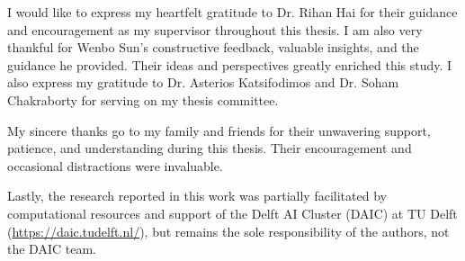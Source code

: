 \documentclass[
11pt, %
english, %
singlespacing, %
parskip, %
headsepline, %
dvipsnames]{misc/MastersDoctoralThesis} %
\theoremstyle{definition}
\begin{document}

\begin{acknowledgements}
    \addchaptertocentry{\acknowledgementname} %
    I would like to express my heartfelt gratitude to Dr. Rihan Hai for their guidance and encouragement as my supervisor throughout this thesis. I am also very thankful for Wenbo Sun's constructive feedback, valuable insights, and the guidance he provided. Their ideas and perspectives greatly enriched this study. I also express my gratitude to Dr. Asterios Katsifodimos and Dr. Soham Chakraborty for serving on my thesis committee.

    My sincere thanks go to my family and friends for their unwavering support, patience, and understanding during this thesis. Their encouragement and occasional distractions were invaluable.

    Lastly, the research reported in this work was partially facilitated by computational resources and support of the Delft AI Cluster (DAIC) at TU Delft (\url{https://daic.tudelft.nl/}), but remains the sole responsibility of the authors, not the DAIC team.
\end{acknowledgements}


\tableofcontents %

\listoffigures %

\listoftables %





\end{document}
